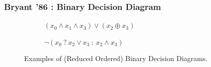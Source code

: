 \documentclass[english, aspectratio=169]{beamer}
\begin{document}
\blankframe

\begin{frame}
  \frametitle{Bryant '86 : Binary Decision Diagram}

  \begin{figure}
    \centering

    \begin{subfigure}{0.49\linewidth}
      \centering

      \begin{tikzpicture}[scale=0.8, every node/.style={transform shape}]
        
      \end{tikzpicture}

      \caption{$(x_0 \wedge x_1 \wedge x_3) \vee (x_2 \oplus x_3)$}
    \end{subfigure}
    \begin{subfigure}{0.49\linewidth}
      \centering

      \begin{tikzpicture}[scale=0.8, every node/.style={transform shape}]
        
      \end{tikzpicture}

      \caption{$\neg (x_0 \ ?\ x_2 \vee x_3 \ :\ x_2 \wedge x_3)$}
    \end{subfigure}

    \caption{Examples of (Reduced Ordered) Binary Decision Diagrams.}
  \end{figure}
\end{frame}
\end{document}
